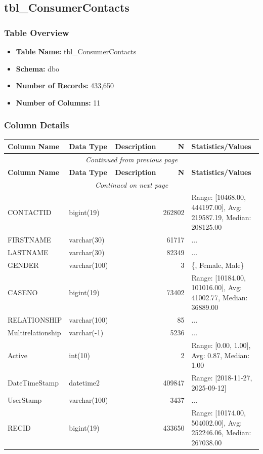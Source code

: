 \begin{landscape}
\subsection{tbl\_ConsumerContacts}

\subsubsection{Table Overview}
\begin{itemize}
\item \textbf{Table Name:} tbl\_ConsumerContacts
\item \textbf{Schema:} dbo
\item \textbf{Number of Records:} 433,650
\item \textbf{Number of Columns:} 11
\end{itemize}

\subsubsection{Column Details}
\begin{longtable}{|l|l|l|r|p{6cm}|}
\hline
\textbf{Column Name} & \textbf{Data Type} & \textbf{Description} & \textbf{N} & \textbf{Statistics/Values} \\
\hline
\endfirsthead
\multicolumn{5}{c}{\textit{Continued from previous page}} \\
\hline
\textbf{Column Name} & \textbf{Data Type} & \textbf{Description} & \textbf{N} & \textbf{Statistics/Values} \\
\hline
\endhead
\hline
\multicolumn{5}{c}{\textit{Continued on next page}} \\
\endfoot
\hline
\endlastfoot
CONTACTID & bigint(19) &  & 262802 & Range: [10468.00, 444197.00], Avg: 219587.19, Median: 208125.00 \\
\hline
FIRSTNAME & varchar(30) &  & 61717 & ... \\
\hline
LASTNAME & varchar(30) &  & 82349 & ... \\
\hline
GENDER & varchar(100) &  & 3 & \{, Female, Male\} \\
\hline
CASENO & bigint(19) &  & 73402 & Range: [10184.00, 101016.00], Avg: 41002.77, Median: 36889.00 \\
\hline
RELATIONSHIP & varchar(100) &  & 85 & ... \\
\hline
Multirelationship & varchar(-1) &  & 5236 & ... \\
\hline
Active & int(10) &  & 2 & Range: [0.00, 1.00], Avg: 0.87, Median: 1.00 \\
\hline
DateTimeStamp & datetime2 &  & 409847 & Range: [2018-11-27, 2025-09-12] \\
\hline
UserStamp & varchar(100) &  & 3437 & ... \\
\hline
RECID & bigint(19) &  & 433650 & Range: [10174.00, 504002.00], Avg: 252246.06, Median: 267038.00 \\
\hline
\end{longtable}


\end{landscape}
